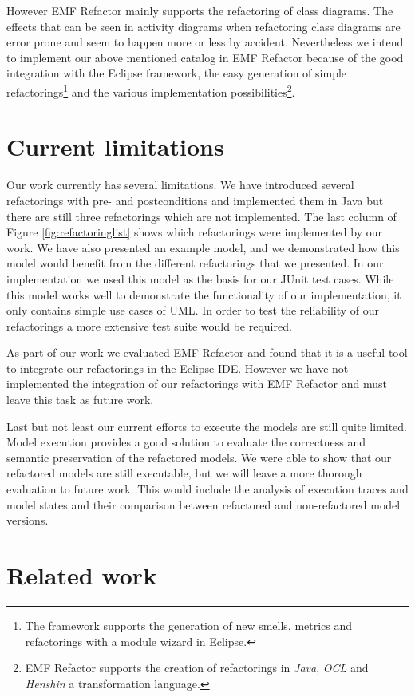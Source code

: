 \documentclass{llncs}
\begin{document}
However EMF Refactor mainly supports the refactoring of class diagrams. The effects that can be seen in activity diagrams 
when refactoring class diagrams are error prone and seem to happen more or less by accident. Nevertheless we intend to 
implement our above mentioned catalog in EMF Refactor because of the good integration with the Eclipse framework, the 
easy generation of simple refactorings\footnote{The framework supports the generation of new smells, metrics and 
refactorings with a module wizard in Eclipse.} and the various implementation possibilities\footnote{EMF Refactor 
supports the creation of refactorings in \textit{Java}, \textit{OCL} and \textit{Henshin} a transformation language.}.

\section{Current limitations}
\label{sec:limitations}
Our work currently has several limitations. We have introduced several refactorings with pre- and postconditions and implemented them
in Java but there are still three refactorings which are not implemented. The last column of Figure \ref{fig:refactoringlist} shows 
which refactorings were implemented by our work. We have also presented an example model, and we demonstrated how this model 
would benefit from the different refactorings that we presented. In our implementation we used this model as the basis for our JUnit test 
cases. While this model works well to demonstrate the functionality of our implementation, it only contains simple use cases of UML. In order to test the reliability of 
our refactorings a more extensive test suite would be required.

As part of our work we evaluated EMF Refactor and found that it is a useful tool to integrate our refactorings in the Eclipse
IDE. However we have not implemented the integration of our refactorings with EMF Refactor and must leave this task as future 
work.

Last but not least our current efforts to execute the models are still quite limited. Model execution provides a good solution to 
evaluate the correctness and semantic preservation of the refactored models. We were able to show that our refactored models are still 
executable, but we will leave a more thorough evaluation to future work. This would include the analysis of execution traces and
model states and their comparison between refactored and non-refactored model versions.

\section{Related work}
\label{sec:relatedwork}
\end{document}
